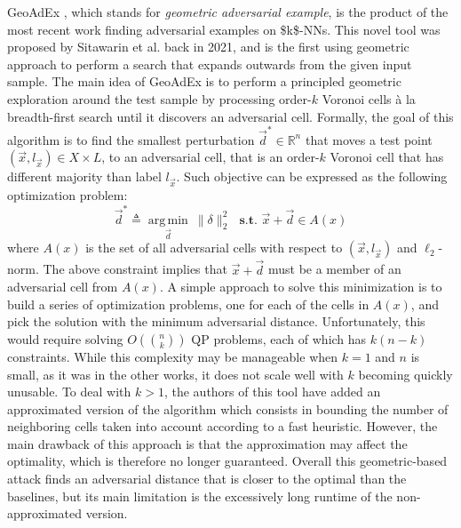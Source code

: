 GeoAdEx \cite{SitawarinKSW21}, which stands for \emph{geometric adversarial example}, is the product of the most recent work finding adversarial examples on \acsp{$k$-NN}. This novel tool was proposed by Sitawarin et al. back in 2021, and is the first using geometric approach to perform a search that expands outwards from the given input sample. The main idea of GeoAdEx is to perform a principled geometric exploration around the test sample by processing order-$k$ Voronoi cells à la breadth-first search until it discovers an adversarial cell. Formally, the goal of this algorithm is to find the smallest perturbation $\vec{d}^* \in \mathbb{R}^n$ that moves a test point $(\vec{x}, l_{\vec{x}}) \in X \times L$, to an adversarial cell, that is an order-$k$ Voronoi cell that has different majority than label $l_{\vec{x}}$. Such objective can be expressed as the following optimization problem:
\begin{equation*}
	\vec{d}^* \triangleq \operatorname*{arg\,min}_{\vec{d}} ~ \lVert \delta \rVert_2^2 ~~~ \textbf{s.t.  } \vec{x} + \vec{d} \in A(x)
\end{equation*}
where $A(x)$ is the set of all adversarial cells with respect to $(\vec{x}, l_{\vec{x}})$ and $\ell_2$-norm. The above constraint implies that $\vec{x} + \vec{d}$ must be a member of an adversarial cell from $A(x)$. A simple approach to solve this minimization is to build a series of optimization problems, one for each of the cells in $A(x)$, and pick the solution with the minimum adversarial distance. Unfortunately, this would require solving $O({n \choose k})$ \acs{QP} problems, each of which has $k(n - k)$ constraints. While this complexity may be manageable when $k = 1$ and $n$ is small, as it was in the other works, it does not scale well with $k$ becoming quickly unusable. To deal with $k > 1$, the authors of this tool have added an approximated version of the algorithm which consists in bounding the number of neighboring cells taken into account according to a fast heuristic. However, the main drawback of this approach is that the approximation may affect the optimality, which is therefore no longer guaranteed. Overall this geometric-based attack finds an adversarial distance that is closer to the optimal than the baselines, but its main limitation is the excessively long runtime of the non-approximated version.

